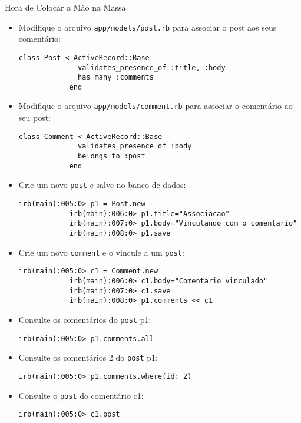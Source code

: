 \begin{frame}{Hora de Colocar a Mão na Massa}
	\begin{itemize}
		\item Modifique o arquivo \verb|app/models/post.rb| para associar 
		o post aos seus comentário:
		\begin{lstlisting}[style=RubyInputStyle]
			class Post < ActiveRecord::Base
			  validates_presence_of :title, :body
			  has_many :comments
			end
		\end{lstlisting}
		
		\item Modifique o arquivo \verb|app/models/comment.rb| para associar 
		o comentário ao seu post:
		\begin{lstlisting}[style=RubyInputStyle]
			class Comment < ActiveRecord::Base
			  validates_presence_of :body
			  belongs_to :post
			end
		\end{lstlisting}
		
		\item Crie um novo \verb|post| e salve no banco de dados:
		\begin{lstlisting}[style=BashInputBasicStyle]
			irb(main):005:0> p1 = Post.new
			irb(main):006:0> p1.title="Associacao"
			irb(main):007:0> p1.body="Vinculando com o comentario"
			irb(main):008:0> p1.save
		\end{lstlisting}
		
		\item Crie um novo \verb|comment| e o vincule a um \verb|post|:
		\begin{lstlisting}[style=BashInputBasicStyle]
			irb(main):005:0> c1 = Comment.new
			irb(main):006:0> c1.body="Comentario vinculado"
			irb(main):007:0> c1.save
			irb(main):008:0> p1.comments << c1
		\end{lstlisting}
		
		\item Consulte os comentários do \verb|post| p1:
		\begin{lstlisting}[style=BashInputBasicStyle]
			irb(main):005:0> p1.comments.all
		\end{lstlisting}
		
		\item Consulte os comentários 2 do \verb|post| p1:
		\begin{lstlisting}[style=BashInputBasicStyle]
			irb(main):005:0> p1.comments.where(id: 2)
		\end{lstlisting}
		
		\item Consulte o \verb|post| do comentário c1:
		\begin{lstlisting}[style=BashInputBasicStyle]
			irb(main):005:0> c1.post
		\end{lstlisting}
					
	\end{itemize}
\end{frame}